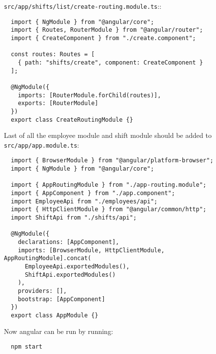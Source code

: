\texttt{src/app/shifts/list/create-routing.module.ts}::
\begin{verbatim}
  import { NgModule } from "@angular/core";
  import { Routes, RouterModule } from "@angular/router";
  import { CreateComponent } from "./create.component";

  const routes: Routes = [
    { path: "shifts/create", component: CreateComponent }
  ];

  @NgModule({
    imports: [RouterModule.forChild(routes)],
    exports: [RouterModule]
  })
  export class CreateRoutingModule {}
\end{verbatim}

Last of all the employee module and shift module should be added to \texttt{src/app/app.module.ts}:
\begin{verbatim}
  import { BrowserModule } from "@angular/platform-browser";
  import { NgModule } from "@angular/core";

  import { AppRoutingModule } from "./app-routing.module";
  import { AppComponent } from "./app.component";
  import EmployeeApi from "./employees/api";
  import { HttpClientModule } from "@angular/common/http";
  import ShiftApi from "./shifts/api";

  @NgModule({
    declarations: [AppComponent],
    imports: [BrowserModule, HttpClientModule, AppRoutingModule].concat(
      EmployeeApi.exportedModules(),
      ShiftApi.exportedModules()
    ),
    providers: [],
    bootstrap: [AppComponent]
  })
  export class AppModule {}
\end{verbatim}

Now angular can be run by running:
\begin{verbatim}
  npm start
\end{verbatim}
